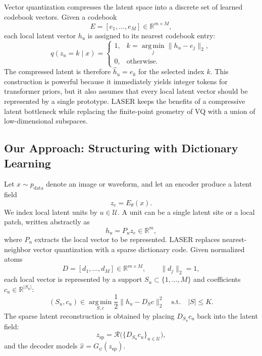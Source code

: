 \documentclass[10pt]{article}
\begin{document}
Vector quantization compresses the latent space into a discrete set of learned codebook vectors. Given a codebook
\begin{equation}
    E = [e_1,\ldots,e_M] \in \mathbb{R}^{m \times M},
\end{equation}
each local latent vector $h_u$ is assigned to its nearest codebook entry:
\begin{equation}
    q(z_u=k \mid x)
    =
    \begin{cases}
        1, & k = \operatorname*{arg\,min}_{j}\|h_u-e_j\|_2,\\
        0, & \text{otherwise.}
    \end{cases}
    \label{eq:vq-assignment}
\end{equation}
The compressed latent is therefore $\hat{h}_u=e_k$ for the selected index $k$. This construction is powerful because it immediately yields integer tokens for transformer priors, but it also assumes that every local latent vector should be represented by a single prototype. LASER keeps the benefits of a compressive latent bottleneck while replacing the finite-point geometry of VQ with a union of low-dimensional subspaces.

\subsection{Our Approach: Structuring with Dictionary Learning}

Let $x \sim p_{\mathrm{data}}$ denote an image or waveform, and let an encoder produce a latent field
\begin{equation}
    z_e = E_\theta(x).
\end{equation}
We index local latent units by $u \in \mathcal{U}$. A unit can be a single latent site or a local patch, written abstractly as
\begin{equation}
    h_u = P_u z_e \in \mathbb{R}^{m},
\end{equation}
where $P_u$ extracts the local vector to be represented. LASER replaces nearest-neighbor vector quantization with a sparse dictionary code. Given normalized atoms
\begin{equation}
    D = [d_1,\ldots,d_M] \in \mathbb{R}^{m \times M}, \qquad \|d_j\|_2 = 1,
\end{equation}
each local vector is represented by a support $S_u \subset \{1,\ldots,M\}$ and coefficients $c_u \in \mathbb{R}^{|S_u|}$:
\begin{equation}
    (S_u,c_u)
    \in
    \operatorname*{arg\,min}_{S,c}
    \frac{1}{2}\|h_u - D_S c\|_2^2
    \quad \mathrm{s.t.} \quad |S| \le K .
    \label{eq:sparse-code}
\end{equation}
The sparse latent reconstruction is obtained by placing $D_{S_u}c_u$ back into the latent field:
\begin{equation}
    z_{\mathrm{sp}} = \mathcal{R}\bigl(\{D_{S_u}c_u\}_{u \in \mathcal{U}}\bigr),
\end{equation}
and the decoder models $\hat{x}=G_\psi(z_{\mathrm{sp}})$.
\end{document}
